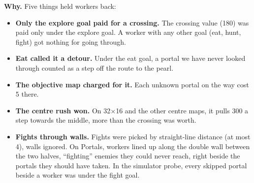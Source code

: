 \documentclass[11pt,a4paper]{article}
\begin{document}
\textbf{Why.} Five things held workers back:
\begin{itemize}
  \item \textbf{Only the explore goal paid for a crossing.} The crossing value (180) was paid only under the explore goal. A
        worker with any other goal (eat, hunt, fight) got nothing for going through.
  \item \textbf{Eat called it a detour.} Under the eat goal, a portal we have never looked through counted as a step off the
        route to the pearl.
  \item \textbf{The objective map charged for it.} Each unknown portal on the way cost 5 there.
  \item \textbf{The centre rush won.} On 32$\times$16 and the other centre maps, it pulls 300 a step towards the middle, more than
        the crossing was worth.
  \item \textbf{Fights through walls.} Fights were picked by straight-line distance (at most 4), walls ignored. On Portals,
        workers lined up along the double wall between the two halves, ``fighting'' enemies they could never reach, right
        beside the portals they should have taken. In the simulator probe, every skipped portal beside a worker was under the
        fight goal.
\end{itemize}
\end{document}
